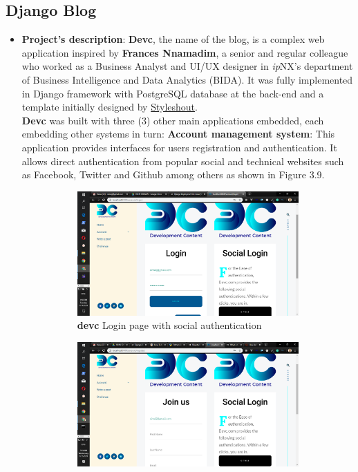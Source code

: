 \subsection{Django Blog}
\begin{itemize}
	\item \textbf{Project's description}: \textbf{Devc}, the name of the blog, is a complex web application inspired by \textbf{Frances Nnamadim}, a senior and regular colleague who worked as a Business Analyst and \ac{UI}/\ac{UX} designer in \textit{ip}NX's department of Business Intelligence and Data Analytics (BIDA). It was fully implemented in Django framework with PostgreSQL database at the back-end and a template initially designed by \href{https://www.styleshout.com/}{Styleshout}.\\
	
	\textbf{Devc} was built with three (3) other main applications embedded, each embedding other systems in turn:
	\subitem \textbf{Account management system}: This application provides interfaces for users registration and authentication. It allows direct authentication from popular social and technical websites such as Facebook, Twitter and Github among others as shown in Figure 3.9.
	\begin{figure}[!htbp]
		\centering
		\begin{subfigure}[b]{0.45\textwidth}
			\centering
			\includegraphics[width=\linewidth]{./devclogin}
			\caption{\textbf{devc} Login page with social authentication}
		\end{subfigure}
		\hfill
		\begin{subfigure}[b]{0.45\textwidth}
			\centering
			\includegraphics[width=\linewidth]{./devcsignup}

\end{subfigure}
\end{figure}
\end{itemize}
